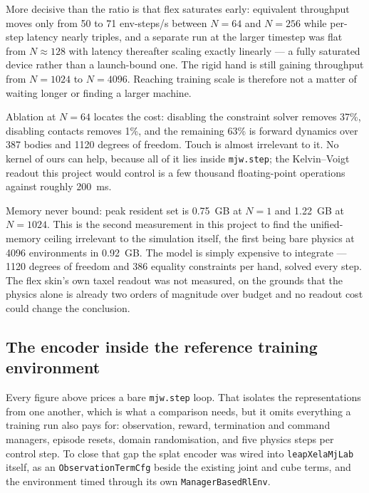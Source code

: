 \documentclass[journal]{IEEEtran}
\begin{document}
More decisive than the ratio is that flex saturates early: equivalent throughput moves only from 50 to 71 env-steps/s between $N=64$ and $N=256$ while per-step latency nearly triples, and a separate run at the larger timestep was flat from $N\approx128$ with latency thereafter scaling exactly linearly --- a fully saturated device rather than a launch-bound one. The rigid hand is still gaining throughput from $N=1024$ to $N=4096$. Reaching training scale is therefore not a matter of waiting longer or finding a larger machine.

Ablation at $N=64$ locates the cost: disabling the constraint solver removes 37\%, disabling contacts removes 1\%, and the remaining 63\% is forward dynamics over 387 bodies and 1120 degrees of freedom. Touch is almost irrelevant to it. No kernel of ours can help, because all of it lies inside \texttt{mjw.step}; the Kelvin--Voigt readout this project would control is a few thousand floating-point operations against roughly 200~ms.

Memory never bound: peak resident set is 0.75~GB at $N=1$ and 1.22~GB at $N=1024$. This is the second measurement in this project to find the unified-memory ceiling irrelevant to the simulation itself, the first being bare physics at 4096 environments in 0.92~GB. The model is simply expensive to integrate --- 1120 degrees of freedom and 386 equality constraints per hand, solved every step. The flex skin's own taxel readout was not measured, on the grounds that the physics alone is already two orders of magnitude over budget and no readout cost could change the conclusion.

\subsection{The encoder inside the reference training environment}
\label{sec:mjlab}

Every figure above prices a bare \texttt{mjw.step} loop. That isolates the representations from one another, which is what a comparison needs, but it omits everything a training run also pays for: observation, reward, termination and command managers, episode resets, domain randomisation, and five physics steps per control step. To close that gap the splat encoder was wired into \texttt{leapXelaMjLab} itself, as an \texttt{ObservationTermCfg} beside the existing joint and cube terms, and the environment timed through its own \texttt{ManagerBasedRlEnv}.
\end{document}
